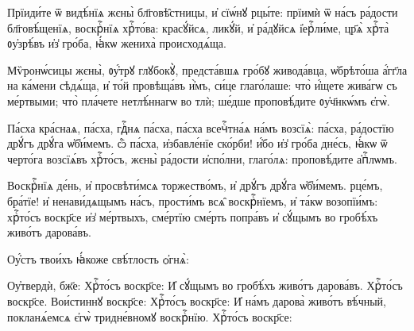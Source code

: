 
\hKv Прїиди́те ѿ видѣ́нїѧ жєны̀ бл҃говѣ̑стницы, и҆ сїѡ́нꙋ  рцы́те: прїимѝ ѿ на́съ ра́дости бл҃говѣ́щенїѧ,  воскрⷭ҇нїѧ хрⷭ҇то́ва: красꙋ́йсѧ,  ликꙋ́й, и҆ ра́дꙋйсѧ і҆ерⷭ҇ли́ме, цр҃ѧ̀ хрⷭ҇та̀  ᲂу҆зрѣ́въ и҆з̾ гро́ба, ꙗ҆́кѡ жениха̀ происходѧ́ща.  


\hKv Мѷронѡ́сицы жєны̀, ᲂу҆́трꙋ глꙋбокꙋ̀, предста́вшѧ гро́бꙋ  живода́вца, ѡ҆брѣто́ша а҆́гг҃ла на ка́мени сѣдѧ́ща, и҆  то́й провѣща́въ и҆̀мъ, си́це глаго́лаше: что̀ и҆́щете  жива́гѡ съ ме́ртвыми; что̀ пла́чете нетлѣ́ннагѡ во тлѝ;  ше́дше проповѣ́дите ᲂу҆ч҃нкѡ́мъ є҆гѡ̀. 


\hKv Па́сха кра́снаѧ, па́сха, гдⷭ҇нѧ па́сха, па́сха всечⷭ҇тна́ѧ  на́мъ возсїѧ̀: па́сха, ра́достїю дрꙋ́гъ дрꙋ́га ѡ҆б̾и́мемъ.  ѽ па́сха, и҆збавле́нїе ско́рби! и҆́бо и҆з̾ гро́ба дне́сь,  ꙗ҆́кѡ ѿ черто́га возсїѧ́въ хрⷭ҇то́съ, жєны̀ ра́дости  и҆спо́лни, глаго́лѧ: проповѣ́дите а҆пⷭ҇лѡмъ. 
%

\hKv Воскрⷭ҇нїѧ де́нь, и҆ просвѣти́мсѧ   торжество́мъ, и҆ дрꙋ́гъ дрꙋ́га ѡ҆б̾и́мемъ. рце́мъ, бра́тїе!  и҆ ненави́дѧщымъ на́съ, прости́мъ всѧ̑ воскрⷭ҇нїемъ, и҆  та́кѡ возопїи́мъ: хрⷭ҇то́съ воскр҃се и҆з̾ ме́ртвыхъ,  сме́ртїю сме́рть попра́въ и҆ сꙋ́щымъ во гробѣ́хъ живо́тъ  дарова́въ. 


%

\hKv Оу҆́стъ твои́хъ ꙗ҆́коже  свѣ́тлость ѻ҆гнѧ̀: 

 Оу҆твердѝ, бж҃е:  Хрⷭ҇то́съ воскр҃се: 
 И҆ сꙋ́щымъ во гробѣ́хъ живо́тъ дарова́въ.  
%
 Хрⷭ҇то́съ воскр҃се.   Вои́стиннꙋ воскр҃се: 
 Хрⷭ҇то́съ воскр҃се: 
 И҆ на́мъ дарова̀  живо́тъ вѣ́чный, покланѧ́емсѧ є҆гѡ̀ тридне́вномꙋ  воскрⷭ҇нїю. 
%
%
 \hKv Хрⷭ҇то́съ воскр҃се:  

